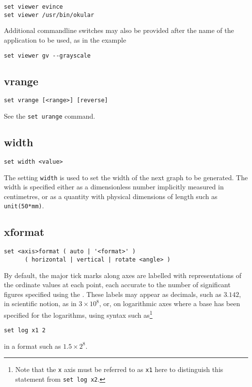 \begin{verbatim}
set viewer evince
set viewer /usr/bin/okular
\end{verbatim}

\noindent Additional commandline switches may also be provided after the name
of the application to be used, as in the example

\begin{verbatim}
set viewer gv --grayscale
\end{verbatim}


\subsection{vrange}

\begin{verbatim}
set vrange [<range>] [reverse]
\end{verbatim}

See the {\tt set urange} command.


\subsection{width}

\begin{verbatim}
set width <value>
\end{verbatim}

The setting {\tt width} is used to set the width of the next graph to be
generated. The width is specified either as a dimensionless number
implicitly measured in centimetres, or as a quantity with physical dimensions
of length such as {\tt unit(50*mm)}.


\subsection{xformat}

\begin{verbatim}
set <axis>format ( auto | '<format>' )
      ( horizontal | vertical | rotate <angle> )
\end{verbatim}

By default, the major tick marks along axes are labelled with representations
of the ordinate values at each point, each accurate to the number of
significant figures specified using the . These
labels may appear as decimals, such as $3.142$, in scientific notion, as in
$3\times10^8$, or, on logarithmic axes where a base has been specified for the
logarithms, using syntax such as\footnote{Note that the {\tt x} axis must be
referred to as {\tt x1} here to distinguish this statement from {\tt set log
x2}.}
\begin{verbatim}
set log x1 2
\end{verbatim}
in a format such as $1.5\times2^8$.

